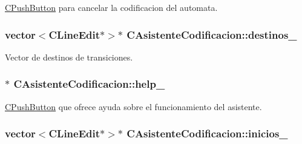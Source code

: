 \hyperlink{classCPushButton}{C\+Push\+Button} para cancelar la codificacion del automata. 

\subsubsection[{\texorpdfstring{destinos\+\_\+}{destinos_}}]{\setlength{\rightskip}{0pt plus 5cm}vector$<${\bf C\+Line\+Edit}$\ast$$>$$\ast$ C\+Asistente\+Codificacion\+::destinos\+\_\+\hspace{0.3cm}{\ttfamily [private]}}\hypertarget{classCAsistenteCodificacion_a421a87b8ddfa213452349bcf55b22d27}{}\label{classCAsistenteCodificacion_a421a87b8ddfa213452349bcf55b22d27}


Vector de destinos de transiciones. 

\subsubsection[{\texorpdfstring{help\+\_\+}{help_}}]{$\ast$ C\+Asistente\+Codificacion\+::help\+\_\+\hspace{0.3cm}{\ttfamily [private]}}\hypertarget{classCAsistenteCodificacion_a8d7ffb128dc1d576413d2a9a74f3884f}{}\label{classCAsistenteCodificacion_a8d7ffb128dc1d576413d2a9a74f3884f}


\hyperlink{classCPushButton}{C\+Push\+Button} que ofrece ayuda sobre el funcionamiento del asistente. 

\subsubsection[{\texorpdfstring{inicios\+\_\+}{inicios_}}]{\setlength{\rightskip}{0pt plus 5cm}vector$<${\bf C\+Line\+Edit}$\ast$$>$$\ast$ C\+Asistente\+Codificacion\+::inicios\+\_\+\hspace{0.3cm}{\ttfamily [private]}}\hypertarget{classCAsistenteCodificacion_ac0ac600fe894126b5273249b1748a267}{}\label{classCAsistenteCodificacion_ac0ac600fe894126b5273249b1748a267}


